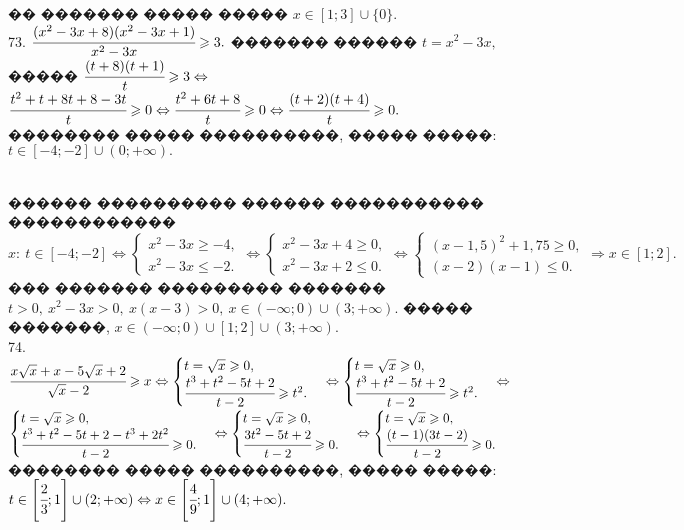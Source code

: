\documentclass[12pt]{article}
\begin{document}
 �� ������� ����� ����� $x \in [1;3]\cup\{0\}.$\\
73. $\cfrac{(x^2-3x+8)(x^2-3x+1)}{x^2-3x}\geqslant3.$ ������� ������ $t=x^2-3x,$ ����� $\cfrac{(t+8)(t+1)}{t}\geqslant3\Leftrightarrow$\\$
\cfrac{t^2+t+8t+8-3t}{t}\geqslant0\Leftrightarrow \cfrac{t^2+6t+8}{t}\geqslant0\Leftrightarrow \cfrac{(t+2)(t+4)}{t}\geqslant0.$ �������� ����� ����������, ����� �����: $t\in[-4;-2]\cup(0;+\infty).$
\begin{figure}[ht!]
\end{figure}\\
������ ���������� ������ ����������� ������������ $x:\ t\in[-4;-2]\Leftrightarrow\begin{cases} x^2-3x\geqslant-4,\\ x^2-3x\leqslant-2.\end{cases}
\Leftrightarrow\begin{cases} x^2-3x+4\geqslant0,\\ x^2-3x+2\leqslant0.\end{cases}\Leftrightarrow
\begin{cases} (x-1,5)^2+1,75\geqslant0,\\ (x-2)(x-1)\leqslant0.\end{cases}\Rightarrow x\in[1;2].$ ��� ������� ��������� ������� $t>0,\ x^2-3x>0,\ x(x-3)>0,\
x\in(-\infty;0)\cup(3;+\infty).$ ����� �������,  $x\in(-\infty;0)\cup[1;2]\cup(3;+\infty).$\\
74. $\cfrac{x\sqrt{x}+x-5\sqrt{x}+2}{\sqrt{x}-2}\geqslant x \Leftrightarrow \begin{cases} t=\sqrt{x}\geqslant0,\\ \cfrac{t^3+t^2-5t+2}{t-2}\geqslant t^2.\end{cases}
\Leftrightarrow \begin{cases} t=\sqrt{x}\geqslant0,\\ \cfrac{t^3+t^2-5t+2}{t-2}\geqslant t^2.\end{cases}
\Leftrightarrow$\\$ \begin{cases} t=\sqrt{x}\geqslant0,\\ \cfrac{t^3+t^2-5t+2-t^3+2t^2}{t-2}\geqslant 0.\end{cases}
\Leftrightarrow \begin{cases} t=\sqrt{x}\geqslant0,\\ \cfrac{3t^2-5t+2}{t-2}\geqslant 0.\end{cases}
\Leftrightarrow \begin{cases} t=\sqrt{x}\geqslant0,\\ \cfrac{(t-1)(3t-2)}{t-2}\geqslant 0.\end{cases}$ �������� ����� ����������, ����� �����: $t\in\left[\cfrac{2}{3};1\right]\cup(2;+\infty)\Leftrightarrow x \in\left[\cfrac{4}{9};1\right]\cup(4;+\infty).$
\end{document}

